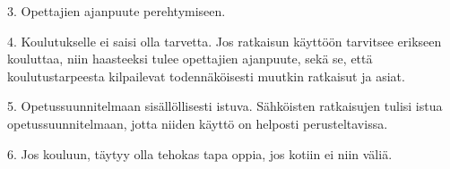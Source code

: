 \documentclass[utf8,bachelor]{gradu3}
\begin{document}
3. Opettajien ajanpuute perehtymiseen.

4. Koulutukselle ei saisi olla tarvetta.
Jos ratkaisun käyttöön tarvitsee erikseen kouluttaa, niin haasteeksi tulee opettajien ajanpuute, sekä se, että koulutustarpeesta kilpailevat todennäköisesti muutkin ratkaisut ja asiat.

5. Opetussuunnitelmaan sisällöllisesti istuva.
Sähköisten ratkaisujen tulisi istua opetussuunnitelmaan, jotta niiden käyttö on helposti perusteltavissa.

6. Jos kouluun, täytyy olla tehokas tapa oppia, jos kotiin ei niin väliä.

\printbibliography
\end{document}

